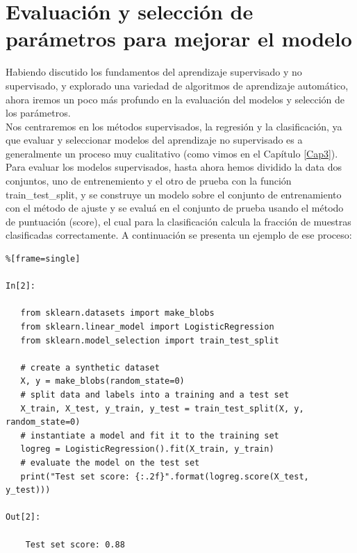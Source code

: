 

	
	\chapter{Evaluación y selección de  parámetros  para  mejorar el modelo}{\label{Cap5}}

Habiendo discutido los fundamentos del aprendizaje supervisado y no supervisado, y
explorado una variedad de algoritmos de aprendizaje automático, ahora iremos un poco  más
profundo en la evaluación del modelos y selección de los parámetros.\\

Nos centraremos en los métodos supervisados, la regresión y la clasificación, ya que   evaluar 
y  seleccionar modelos del aprendizaje no supervisado es a generalmente  un proceso muy cualitativo (como
vimos en el Capítulo \ref{Cap3}).\\


Para evaluar los modelos supervisados, hasta ahora hemos dividido la data dos conjuntos, uno de  entrenemiento  y el otro  de prueba con la función {\ttfamily train\_test\_split}, y se  construye  un modelo sobre el conjunto de  entrenamiento con el método de ajuste y se evaluá en el conjunto de prueba usando el método de puntuación (score), el cual para la clasificación calcula la fracción de muestras clasificadas correctamente. A continuación se presenta un ejemplo de ese proceso:


\begin{lstlisting}%[frame=single]

In[2]:

   from sklearn.datasets import make_blobs
   from sklearn.linear_model import LogisticRegression
   from sklearn.model_selection import train_test_split
   
   # create a synthetic dataset
   X, y = make_blobs(random_state=0)
   # split data and labels into a training and a test set
   X_train, X_test, y_train, y_test = train_test_split(X, y, random_state=0)
   # instantiate a model and fit it to the training set
   logreg = LogisticRegression().fit(X_train, y_train)
   # evaluate the model on the test set
   print("Test set score: {:.2f}".format(logreg.score(X_test, y_test)))

Out[2]:

    Test set score: 0.88

\end{lstlisting}


